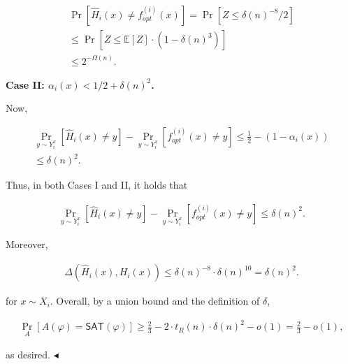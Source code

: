 \documentclass[10pt,a4paper]{article}
\begin{document}
\[\begin{gathered}
\displaystyle\Pr\left[\hat{H}_{i}(x)\neq f_{opt}^{(i)}(x)\right] \displaystyle=\Pr\left[Z\leq\delta(n)^{-8}/2\right] \\
\displaystyle\leq\Pr\left[Z\leq\mathbb{E}[Z]\cdot(1-\delta(n)^{3})\right] \\
\displaystyle\leq 2^{-\Omega(n)}.
\end{gathered}\]





\par\medskip\noindent\textbf{Case II: $\alpha_{i}(x)<1/2+\delta(n)^{2}$.}\par




Now,\par


\[\begin{gathered}
\displaystyle\Pr_{y\sim Y_{i}^{x}}[\hat{H}_{i}(x)\neq y]-\Pr_{y\sim Y_{i}^{x}}[f_{opt}^{(i)}(x)\neq y] \displaystyle\leq\frac{1}{2}-(1-\alpha_{i}(x)) \\
\displaystyle\leq\delta(n)^{2}.
\end{gathered}\]




Thus, in both Cases I and II, it holds that\par


\[\begin{gathered}
\Pr_{y\sim Y_{i}^{x}}[\hat{H}_{i}(x)\neq y]-\Pr_{y\sim Y_{i}^{x}}[f_{opt}^{(i)}(x)\neq y]\leq\delta(n)^{2}.
\end{gathered}\]


Moreover,\par


\[\begin{gathered}
\Delta(\hat{H}_{i}(x),H_{i}(x))\leq\delta(n)^{-8}\cdot\delta(n)^{10}=\delta(n)^{2}.
\end{gathered}\]


for $x\sim X_{i}$. Overall, by a union bound and the definition of $\delta$,\par


\[\begin{gathered}
\Pr_{A}[A(\varphi)={\mathsf{SAT}}(\varphi)]\geq\frac{2}{3}-2\cdot t_{R}(n)\cdot\delta(n)^{2}-o(1)=\frac{2}{3}-o(1),
\end{gathered}\]


as desired.
$\blacktriangleleft$\par
\end{document}
